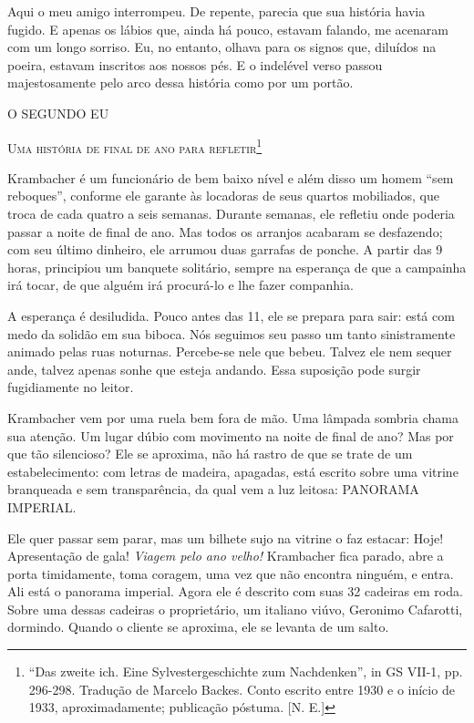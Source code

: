 Aqui o meu amigo interrompeu. De repente, parecia que sua história havia
fugido. E apenas os lábios que, ainda há pouco, estavam falando, me
acenaram com um longo sorriso. Eu, no entanto, olhava para os signos
que, diluídos na poeira, estavam inscritos aos nossos pés. E o indelével
verso passou majestosamente pelo arco dessa história como por um portão.

O SEGUNDO EU

\textsc{Uma história de final de ano para refletir}\footnote{``Das
  zweite ich. Eine Sylvestergeschichte zum Nachdenken'', in GS VII-1,
  pp. 296-298. Tradução de Marcelo Backes. Conto escrito entre 1930 e o
  início de 1933, aproximadamente; publicação póstuma. {[}N. E.{]}}

Krambacher é um funcionário de bem baixo nível e além disso um homem
``sem reboques'', conforme ele garante às locadoras de seus quartos
mobiliados, que troca de cada quatro a seis semanas. Durante semanas,
ele refletiu onde poderia passar a noite de final de ano. Mas todos os
arranjos acabaram se desfazendo; com seu último dinheiro, ele arrumou
duas garrafas de ponche. A partir das 9 horas, principiou um banquete
solitário, sempre na esperança de que a campainha irá tocar, de que
alguém irá procurá-lo e lhe fazer companhia.

A esperança é desiludida. Pouco antes das 11, ele se prepara para sair:
está com medo da solidão em sua biboca. Nós seguimos seu passo um tanto
sinistramente animado pelas ruas noturnas. Percebe-se nele que bebeu.
Talvez ele nem sequer ande, talvez apenas sonhe que esteja andando. Essa
suposição pode surgir fugidiamente no leitor.

Krambacher vem por uma ruela bem fora de mão. Uma lâmpada sombria chama
sua atenção. Um lugar dúbio com movimento na noite de final de ano? Mas
por que tão silencioso? Ele se aproxima, não há rastro de que se trate
de um estabelecimento: com letras de madeira, apagadas, está escrito
sobre uma vitrine branqueada e sem transparência, da qual vem a luz
leitosa: PANORAMA IMPERIAL.

Ele quer passar sem parar, mas um bilhete sujo na vitrine o faz estacar:
Hoje! Apresentação de gala! \emph{Viagem pelo ano velho!} Krambacher
fica parado, abre a porta timidamente, toma coragem, uma vez que não
encontra ninguém, e entra. Ali está o panorama imperial. Agora ele é
descrito com suas 32 cadeiras em roda. Sobre uma dessas cadeiras o
proprietário, um italiano viúvo, Geronimo Cafarotti, dormindo. Quando o
cliente se aproxima, ele se levanta de um salto.

